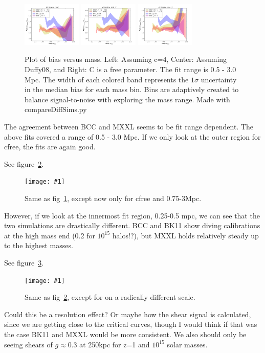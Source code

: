 \documentclass[11pt]{article}
\newcommand{\logfig}[2]{
See figure~\ref{fig:#1}.
\begin{figure}[!ht] 
\texttt{[image: \#1]} 
\caption{#2} 
\label{fig:#1} 
\end{figure}
}
\begin{document}
\begin{figure}[!ht]
\includegraphics[width=0.25\textwidth]{figures/c4_r7}
\includegraphics[width=0.25\textwidth]{figures/duffy_r7}
\includegraphics[width=0.25\textwidth]{figures/cfree_r7}
\caption{Plot of bias versus mass. Left: Assuming c=4, Center: Assuming Duffy08, and Right: C is a free parameter. The fit range is 0.5 - 3.0 Mpc. The width of each colored band represents the $1\sigma$ uncertainty in the median bias for each mass bin. Bins are adaptively created to balance signal-to-noise with exploring the mass range. Made with compareDiffSims.py}
\label{fig:comparing_r7_bias}
\end{figure}

The agreement between BCC and MXXL seems to be fit range dependent. The above fits covered a range of 0.5 - 3.0 Mpc. If we only look at the outer region for cfree, the fits are again good.

\logfig{figures/cfree_r10}{Same as fig~\ref{fig:comparing_r7_bias}, except now only for cfree and 0.75-3Mpc.}

However, if we look at the innermost fit region, 0.25-0.5 mpc, we can see that the two simulations are drastically different. BCC and BK11 show diving calibrations at the high mass end (0.2 for $10^{15}$ halos!?), but MXXL holds relatively steady up to the highest masses. 

\logfig{figures/cfree_r1}{Same as fig~\ref{fig:figures/cfree_r10}, except for on a radically different scale.}

Could this be a resolution effect? Or maybe how the shear signal is calculated, since we are getting close to the critical curves, though I would think if that was the case BK11 and MXXL would be more consistent. We also should only be seeing shears of $g\approx0.3$ at 250kpc for z=1 and $10^{15}$ solar masses.
\end{document}
